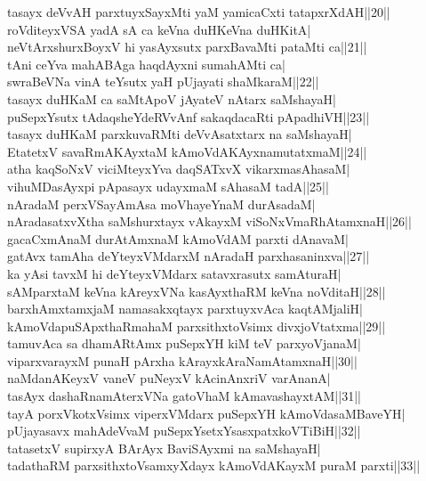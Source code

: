\documentclass{article}
\begin{document}
tasayx deVvAH parxtuyxSayxMti yaM yamicaCxti tatapxrXdAH||20||\\
roVditeyxVSA yadA sA ca keVna duHKeVna duHKitA|\\
neVtArxshurxBoyxV hi yasAyxsutx parxBavaMti pataMti ca||21||\\
tAni ceYva mahABAga haqdAyxni sumahAMti ca|\\
swraBeVNa vinA teYsutx yaH pUjayati shaMkaraM||22||\\
tasayx duHKaM ca saMtApoV jAyateV nAtarx saMshayaH|\\
puSepxYsutx tAdaqsheYdeRVvAnf sakaqdacaRti pApadhiVH||23||\\
tasayx duHKaM parxkuvaRMti deVvAsatxtarx na saMshayaH|\\
EtatetxV savaRmAKAyxtaM kAmoVdAKAyxnamutatxmaM||24||\\
atha kaqSoNxV viciMteyxYva daqSATxvX vikarxmasAhasaM|\\
vihuMDasAyxpi pApasayx udayxmaM sAhasaM tadA||25||\\
nAradaM perxVSayAmAsa moVhayeYnaM durAsadaM|\\
nAradasatxvXtha saMshurxtayx vAkayxM viSoNxVmaRhAtamxnaH||26||\\
gacaCxmAnaM durAtAmxnaM kAmoVdAM parxti dAnavaM|\\
gatAvx tamAha deYteyxVMdarxM nAradaH parxhasaninxva||27||\\
ka yAsi tavxM hi deYteyxVMdarx satavxrasutx samAturaH|\\
sAMparxtaM keVna kAreyxVNa kasAyxthaRM keVna noVditaH||28||\\
barxhAmxtamxjaM namasakxqtayx parxtuyxvAca kaqtAMjaliH|\\
kAmoVdapuSApxthaRmahaM parxsithxtoVsimx divxjoVtatxma||29||\\
tamuvAca sa dhamARtAmx puSepxYH kiM teV parxyoVjanaM|\\
viparxvarayxM punaH pArxha kArayxkAraNamAtamxnaH||30||\\
naMdanAKeyxV vaneV puNeyxV kAcinAnxriV varAnanA|\\
tasAyx dashaRnamAterxVNa gatoVhaM kAmavashayxtAM||31||\\
tayA porxVkotxVsimx viperxVMdarx puSepxYH kAmoVdasaMBaveYH|\\
pUjayasavx mahAdeVvaM puSepxYsetxYsasxpatxkoVTiBiH||32||\\
tatasetxV supirxyA BArAyx BaviSAyxmi na saMshayaH|\\
tadathaRM parxsithxtoVsamxyXdayx kAmoVdAKayxM puraM parxti||33||\\
\end{document}
